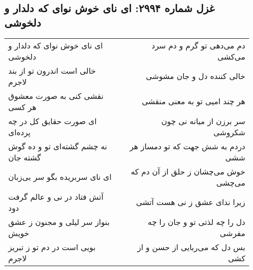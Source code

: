 \begin{center}
\section*{غزل شماره ۲۹۹۴: ای نای خوش نوای که دلدار و دلخوشی}
\label{sec:2994}
\begin{longtable}{l p{0.5cm} r}
ای نای خوش نوای که دلدار و دلخوشی
&&
دم می‌دهی تو گرم و دم سرد می‌کشی
\\
خالی است اندرون تو از بند لاجرم
&&
خالی کننده دل و جان مشوشی
\\
نقشی کنی به صورت معشوق هر کسی
&&
هر چند امیی تو به معنی منقشی
\\
ای صورت حقایق کل در چه پرده‌ای
&&
سر برزن از میانه نی چون شکروشی
\\
نه چشم گشته‌ای تو و ده گوش گشته جان
&&
دردم به شش جهت که تو دمساز هر ششی
\\
ای نای سربریده بگو سر بی‌زبان
&&
خوش می‌چشان ز حلق از آن دم که می‌چشی
\\
آتش فتاد در نی و عالم گرفت دود
&&
زیرا ندای عشق ز نی هست آتشی
\\
بنواز سر لیلی و مجنون ز عشق خویش
&&
دل را چه لذتی تو و جان را چه مفرشی
\\
بویی است در دم تو ز تبریز لاجرم
&&
بس دل که می‌ربایی از حسن و از کشی
\\
\end{longtable}
\end{center}
